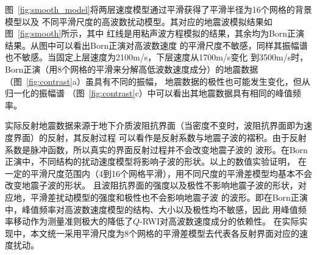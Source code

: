 图~\ref{fig:smooth_model}将两层速度模型通过平滑获得了平滑半径为16个网格的背景模型以及
不同平滑尺度的高波数扰动模型。其对应的地震波模拟结果如图~\ref{fig:smooth}所示，其中
红线是用粘声波方程模拟的结果，其余均为Born正演结果。从图中可以看出Born正演对高波数速度
的平滑尺度不敏感，同样其振幅谱也不敏感。当固定上层速度为2100m/s，下层速度从1700m/s变化
到3500m/s时，Born正演（用8个网格的平滑来分解高低波数速度成分）的地震数据
（图~\ref{fig:contrast}a）虽具有不同的振幅，
地震数据的极性也可能发生变化，但从归一化的振幅谱
（图~\ref{fig:contrast}c）中可以看出其地震数据具有相同的峰值频率。

实际反射地震数据来源于地下介质波阻抗界面（当密度不变时，波阻抗界面即为速度界面）的反射，其反射过程
可以看作是反射系数与地震子波的褶积。由于反射系数是脉冲函数，所以真实的界面反射过程并不会改变地震子波的
波形。在Born正演中，不同结构的扰动速度模型将影响子波的形状。以上的数值实验证明，
在一定的平滑尺度范围内（4到16个网格平滑），用不同尺度的平滑差模型均基本不会改变地震子波的形状。
且波阻抗界面的强度以及极性不影响地震子波的形状，对应地，平滑差扰动模型的强度和极性也不会影响地震子波
的波形。即在Born正演中，峰值频率对高波数速度模型的结构、大小以及极性均不敏感，因此
用峰值频率移动作为测量准则极大的降低了$Q$-RWI对高波数速度成分的依赖性。
在实际实现中，本文统一采用平滑尺度为8个网格的平滑差模型去代表各反射界面对应的速度扰动。

